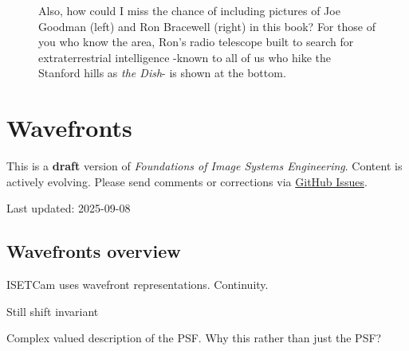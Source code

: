 \documentclass[
  letterpaper,
]{book}
\begin{document}
\begin{tcolorbox}
\begin{figure}[H]
{}

\caption{\label{fig-bracewell-goodman}Also, how could I miss the chance
of including pictures of Joe Goodman (left) and Ron Bracewell (right) in
this book? For those of you who know the area, Ron's radio telescope
built to search for extraterrestrial intelligence -known to all of us
who hike the Stanford hills as \emph{the Dish}- is shown at the bottom.}

\end{figure}%

\end{tcolorbox}


\chapter{Wavefronts}\label{sec-optics-wavefront}

\begin{tcolorbox}[enhanced jigsaw, opacityback=0, breakable, coltitle=black, leftrule=.75mm, left=2mm, colframe=quarto-callout-warning-color-frame, opacitybacktitle=0.6, bottomtitle=1mm, bottomrule=.15mm, toprule=.15mm, title=\textcolor{quarto-callout-warning-color}{\faExclamationTriangle}\hspace{0.5em}{Work in Progress}, titlerule=0mm, toptitle=1mm, colback=white, rightrule=.15mm, colbacktitle=quarto-callout-warning-color!10!white, arc=.35mm]

This is a \textbf{draft} version of \emph{Foundations of Image Systems
Engineering}. Content is actively evolving. Please send comments or
corrections via \href{https://github.com/wandell/FISE-git/issues}{GitHub
Issues}.

Last updated: 2025-09-08

\end{tcolorbox}

\section{Wavefronts overview}\label{sec-optics-wavefront-overview}

ISETCam uses wavefront representations. Continuity.

Still shift invariant

Complex valued description of the PSF. Why this rather than just the
PSF?
\end{document}
